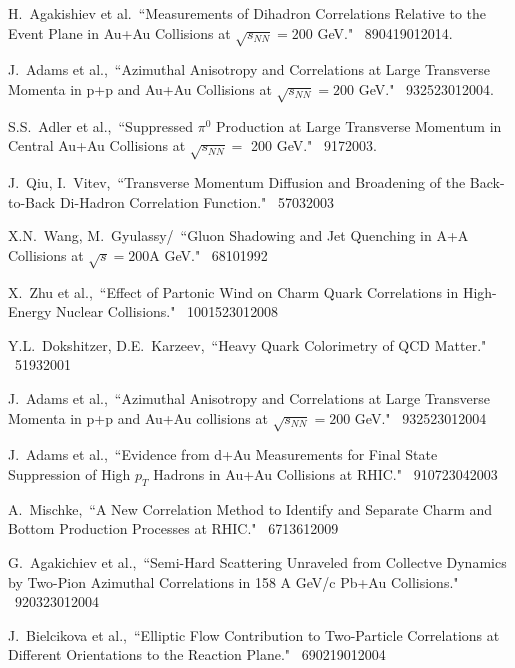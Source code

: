 \begin{thebibliography}{1000}
H.~Agakishiev et al.~``Measurements of Dihadron Correlations Relative to the Event Plane in Au+Au Collisions at $\sqrt{s_{NN}} = 200$ GeV." \Journal{\PRC} {~89}{041901}{2014}.

J.~Adams et al.,~``Azimuthal Anisotropy and Correlations at Large Transverse Momenta in p+p and Au+Au Collisions at $\sqrt{s_{NN}} = 200$ GeV." \Journal{\PRL} {~93}{252301}{2004}.

S.S.~Adler et al.,~``Suppressed $\pi^0$ Production at Large Transverse Momentum in Central Au+Au Collisions at $\sqrt{s_{NN}} = $ 200 GeV." \Journal{\PRL} {~91}{7}{2003}.

J.~Qiu, I.~Vitev,~``Transverse Momentum Diffusion and Broadening of the Back-to-Back Di-Hadron Correlation Function." \Journal{\PLB} {~570}{3}{2003}

X.N.~Wang, M.~Gyulassy/~``Gluon Shadowing and Jet Quenching in A+A Collisions at $\sqrt{s} = 200$A GeV." \Journal{\PRL} {~68}{10}{1992}

X.~Zhu et al.,~``Effect of Partonic Wind on Charm Quark Correlations in High-Energy Nuclear Collisions." \Journal{\PRL} {~100}{152301}{2008}

Y.L.~Dokshitzer, D.E.~Karzeev,~``Heavy Quark Colorimetry of QCD Matter." \Journal{\PLB} {~519}{3}{2001}

J.~Adams et al.,~``Azimuthal Anisotropy and Correlations at Large Transverse Momenta in p+p and Au+Au collisions at $\sqrt{s_{NN}} = 200$ GeV." \Journal{\PRL} {~93}{252301}{2004}

J.~Adams et al.,~``Evidence from d+Au Measurements for Final State Suppression of High $p_T$ Hadrons in Au+Au Collisions at RHIC." \Journal{\PRL} {~91}{072304}{2003}

A.~Mischke,~``A New Correlation Method to Identify and Separate Charm and Bottom Production Processes at RHIC." \Journal{\PLB} {~671}{361}{2009}

G.~Agakichiev et al.,~``Semi-Hard Scattering Unraveled from Collectve Dynamics by Two-Pion Azimuthal Correlations in 158 A GeV/c Pb+Au Collisions." \Journal{\PRL} {~92}{032301}{2004}

J.~Bielcikova et al.,~``Elliptic Flow Contribution to Two-Particle Correlations at Different Orientations to the Reaction Plane." \Journal{\PRC} {~69}{021901}{2004}


\end{thebibliography}

